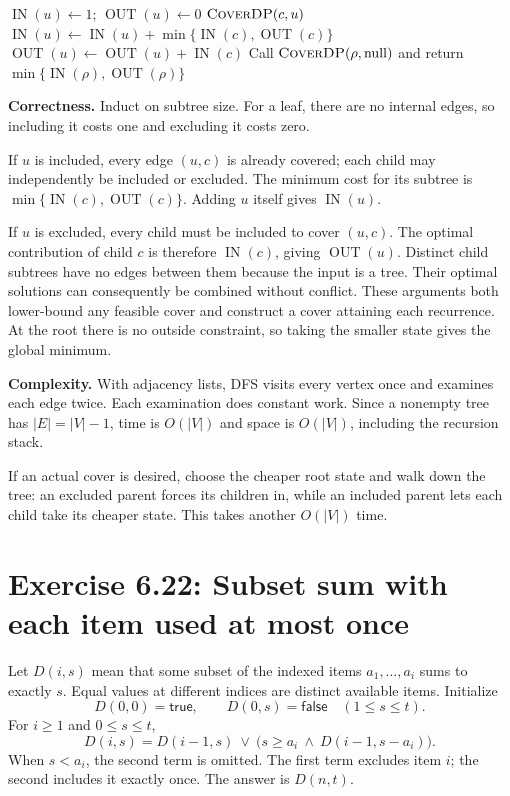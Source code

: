 \documentclass[11pt]{article}
\newcommand{\True}{\mathsf{true}}
\newcommand{\False}{\mathsf{false}}
\newcommand{\IN}{\operatorname{IN}}
\newcommand{\OUT}{\operatorname{OUT}}
\newcommand{\exercise}[2]{\section*{Exercise #1: #2}}
\begin{document}
\begin{algorithm}[H]
\caption{Tree vertex-cover dynamic program}
\begin{algorithmic}[1]
 \State $\IN(u)\gets1$; $\OUT(u)\gets0$
  \State $\Call{CoverDP}{c,u}$
  \State $\IN(u)\gets\IN(u)+\min\{\IN(c),\OUT(c)\}$
  \State $\OUT(u)\gets\OUT(u)+\IN(c)$
 \EndFor
\EndFunction
\State Call $\Call{CoverDP}{\rho,\mathrm{null}}$ and return
       $\min\{\IN(\rho),\OUT(\rho)\}$
\end{algorithmic}
\end{algorithm}

\textbf{Correctness.}
Induct on subtree size. For a leaf, there are no internal edges, so
including it costs one and excluding it costs zero.

If $u$ is included, every edge $(u,c)$ is already covered; each child
may independently be included or excluded. The minimum cost for its
subtree is $\min\{\IN(c),\OUT(c)\}$. Adding $u$ itself gives $\IN(u)$.

If $u$ is excluded, every child must be included to cover $(u,c)$.
The optimal contribution of child $c$ is therefore $\IN(c)$, giving
$\OUT(u)$. Distinct child subtrees have no edges between them because
the input is a tree. Their optimal solutions can consequently be
combined without conflict. These arguments both lower-bound any
feasible cover and construct a cover attaining each recurrence.
At the root there is no outside constraint, so taking the smaller
state gives the global minimum.

\textbf{Complexity.}
With adjacency lists, DFS visits every vertex once and examines each
edge twice. Each examination does constant work.
Since a nonempty tree has $|E|=|V|-1$, time is
$\boxed{O(|V|)}$ and space is $O(|V|)$, including the recursion stack.

If an actual cover is desired, choose the cheaper root state and walk
down the tree: an excluded parent forces its children in, while an
included parent lets each child take its cheaper state. This takes
another $O(|V|)$ time.

\newpage
\exercise{6.22}{Subset sum with each item used at most once}
Let $D(i,s)$ mean that some subset of the indexed items
$a_1,\ldots,a_i$ sums to exactly $s$. Equal values at different
indices are distinct available items. Initialize
\[
 D(0,0)=\True,\qquad D(0,s)=\False\quad(1\le s\le t).
\]
For $i\ge1$ and $0\le s\le t$,
\[
 \boxed{D(i,s)=D(i-1,s)\ \lor\
       \bigl(s\ge a_i\ \land\ D(i-1,s-a_i)\bigr).}
\]
When $s<a_i$, the second term is omitted. The first term excludes item
$i$; the second includes it exactly once. The answer is $D(n,t)$.
\end{document}
